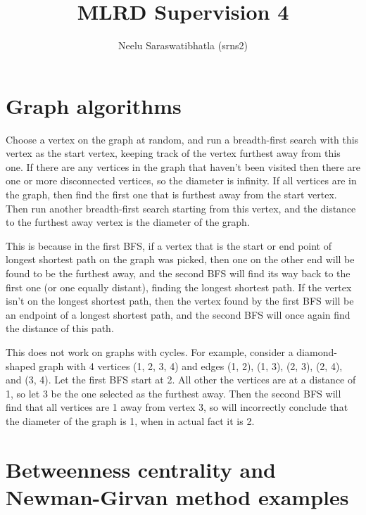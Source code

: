\documentclass[12pt]{article}
\author{Neelu Saraswatibhatla (srns2)}
\title{MLRD Supervision 4}
\date{\vspace{-5ex}}
\begin{document}
\maketitle

\section*{Graph algorithms}

Choose a vertex on the graph at random, and run a breadth-first search with this vertex as the start vertex, keeping track of the vertex furthest away from this one. If there are any vertices in the graph that haven't been visited then there are one or more disconnected vertices, so the diameter is infinity. If all vertices are in the graph, then find the first one that is furthest away from the start vertex. Then run another breadth-first search starting from this vertex, and the distance to the furthest away vertex is the diameter of the graph.

This is because in the first BFS, if a vertex that is the start or end point of longest shortest path on the graph was picked, then one on the other end will be found to be the furthest away, and the second BFS will find its way back to the first one (or one equally distant), finding the longest shortest path. If the vertex isn't on the longest shortest path, then the vertex found by the first BFS will be an endpoint of a longest shortest path, and the second BFS will once again find the distance of this path.

This does not work on graphs with cycles. For example, consider a diamond-shaped graph with 4 vertices (1, 2, 3, 4) and edges (1, 2), (1, 3), (2, 3), (2, 4), and (3, 4). Let the first BFS start at 2. All other the vertices are at a distance of 1, so let 3 be the one selected as the furthest away. Then the second BFS will find that all vertices are 1 away from vertex 3, so will incorrectly conclude that the diameter of the graph is 1, when in actual fact it is 2.

\section*{Betweenness centrality and Newman-Girvan method examples}
\end{document}
